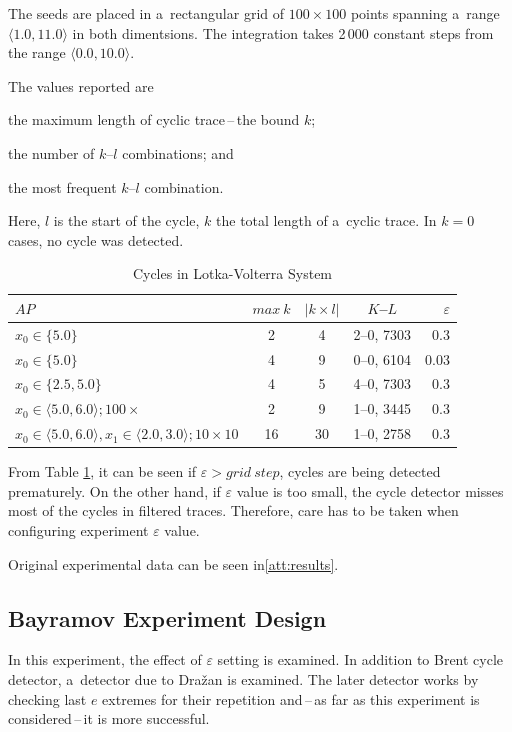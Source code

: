 \documentclass[12pt,twoside,draft]{fithesis}
\begin{document}
The seeds are placed in a~rectangular grid of $100\times 100$ points
spanning a~range $\langle 1.0, 11.0\rangle$ in both dimentsions. The
integration takes 2\,000 constant steps from the range $\langle 0.0,
10.0\rangle$.

The values reported are
\begin{inparaenum}
\item the maximum length of cyclic trace\,--\,the bound $k$;
\item the number of $k$--$l$ combinations; and
\item the most frequent $k$--$l$ combination.
\end{inparaenum}

Here, $l$ is the start of the cycle, $k$ the total length of a~cyclic
trace. In $k=0$ cases, no cycle was detected.
\begin{table}[h]
\label{tab:lv}
\begin{tabular}{p{4cm}|c c c r}
$AP$ &$max\:k$ &$|k\times l|$ &$K$--$L$ &$\varepsilon$\\
\hline
$x_0\in\{5.0\}$
	&2
	&4
	&2--0, 7303
	&0.3\\
$x_0\in\{5.0\}$
	&4
	&9
	&0--0, 6104
	&0.03\\
$x_0\in\{2.5,5.0\}$
	&4
	&5
	&4--0, 7303
	&0.3\\
$x_0\in\langle 5.0,6.0\rangle;100\times$
	&2
	&9
	&1--0, 3445
	&0.3\\
$x_0\in\langle 5.0,6.0\rangle, x_1\in\langle 2.0,3.0\rangle;10\times 10$
	&16
	&30
	&1--0, 2758
	&0.3\\
\end{tabular}
\caption{Cycles in Lotka-Volterra System}
\end{table}

From Table \ref{tab:lv}, it can be seen if $\varepsilon>grid\:step$,
cycles are being detected prematurely. On the other hand,
if $\varepsilon$ value is too small, the cycle detector misses most of
the cycles in filtered traces. Therefore, care has to be taken
when configuring experiment $\varepsilon$ value.

Original experimental data can be seen in\ref{att:results}.




\subsection*{Bayramov Experiment Design}
In this experiment, the effect of $\varepsilon$ setting is examined. In
addition to Brent cycle detector, a~detector due to Dra\v{z}an
\cite{sven} is examined. The later detector works by checking last $e$
extremes for their repetition and\,--\,as far as this experiment is
considered\,--\,it is more successful.
\end{document}
